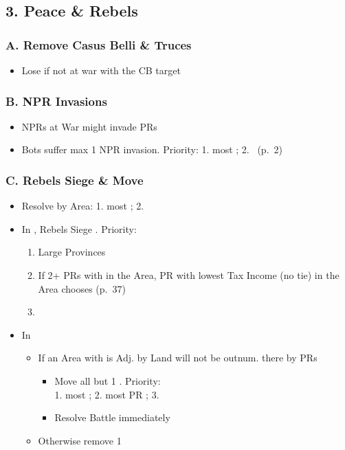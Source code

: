 \documentclass[10pt]{article}
\begin{document}
\subsection*{3. Peace \& Rebels}
\subsubsection*{A. Remove Casus Belli \& Truces}
\begin{itemize}
	\item Lose  if not at war with the CB target
\end{itemize}

\subsubsection*{B. NPR Invasions }
\begin{itemize}
	\item {}NPRs at War might invade PRs
	\botrules
	\item Bots suffer max 1 NPR invasion. Priority: 1. most \rebels; 2. \az (p.~2)
\end{itemize}

\subsubsection*{C. Rebels Siege \& Move}
\begin{itemize}
	\item Resolve by Area: 1. most \rebels; 2. \az
	\item In , Rebels Siege \unrest. Priority:
	\begin{enumerate}
		\item Large Provinces
		\item If 2+ PRs with \unrest in the Area, PR with lowest Tax Income (no tie) in the Area chooses (p.~37)
		\item \az
	\end{enumerate}
	\item In 
	\begin{itemize}
		\item If an Area with \unrest is Adj. by Land  \rebels will not be outnum. there by PRs
		\begin{itemize}
			\item Move all but 1 \rebel. Priority:\\ 1. most \unrest; 2. most PR \towns; 3. \az
			\item Resolve Battle immediately
		\end{itemize}
		\item Otherwise remove 1\rebel
	\end{itemize}
\end{itemize}
\end{document}
